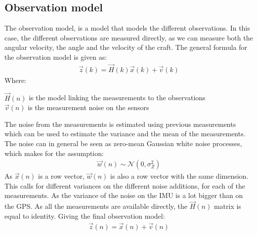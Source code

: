 \subsection{Observation model}
The observation model, is a model that models the different observations. In this case, the different observations are measured directly, as we can measure both the angular velocity, the angle and the velocity of the craft. The general formula for the observation model is given as:
\begin{align}
\vec{z}(k) = \vec{H}(k)\vec{x}(k) + \vec{v}(k)
\end{align}
\noindent Where:
\begin{ffk}
$\vec{H}(n)$ is the model linking the measurements to the observations\\
$\vec{v}(n)$ is the measurement noise on the sensors
\end{ffk}
The noise from the measurements is estimated using previous measurements which can be used to estimate the variance and the mean of the measurements. The noise can in general be seen as zero-mean Gaussian white noise processes, which makes for the assumption:
\begin{align}
\vec{w}(n) \sim \mathcal{N}(0,\sigma_Z^2)
\end{align}
As $\vec{x}(n)$ is a row vector, $\vec{w}(n)$ is also a row vector with the same dimension. This calls for different variances on the different noise additions, for each of the measurements. As the variance of the noise on the \ac{IMU} is a lot bigger than on the \ac{GPS}. As all the measurements are available directly, the $\vec{H}(n)$ matrix is equal to identity. Giving the final observation model:
\begin{align}
\vec{z}(n) = \vec{x}(n) + \vec{v}(n)
\end{align}


